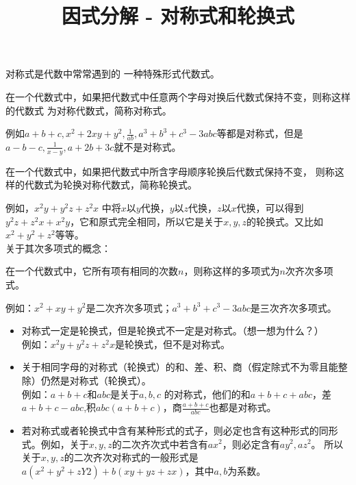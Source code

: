 \documentclass[windows,csize4]{BHCexam}
\title{因式分解 - 对称式和轮换式}
\begin{document}
\maketitle

\begin{groups}
    对称式是代数中常常遇到的 一种特殊形式代数式。\\ 
    \fbox
    {
        \parbox{\textwidth}
        {
            在一个代数式中，如果把代数式中任意两个字母对换后代数式保持不变，则称这样的代数式
            为对称代数式，简称对称式。
        }
    }
    例如$a+b+c,x^2+2xy+y^2,\frac{1}{ab},a^3+b^3+c^3-3abc$等都是对称式，但是
    $a-b-c,\frac{1}{x-y},a+2b+3c$就不是对称式。 \\ 

    \fbox
    {
        \parbox{\textwidth}
        {
            在一个代数式中，如果把代数式中所含字母顺序轮换后代数式保持不变，
            则称这样的代数式为轮换对称代数式，简称轮换式。
        }
    }
    例如，$x^2y+y^2z+z^2x$ 中将$x$以$y$代换，$y$以$z$代换，$z$以$x$代换，可以得到
    $y^2z+z^2x+x^2y$，它和原式完全相同，所以它是关于$x,y,z$的轮换式。又比如$x^2+y^2+z^2$等等。 \\ 

    关于其次多项式的概念： \\
    \fbox
    {
        \parbox{\textwidth}
        {
            在一个代数式中，它所有项有相同的次数$n$，则称这样的多项式为$n$次齐次多项式。
        }
    }
    例如：$x^2+xy+y^2$是二次齐次多项式；$a^3+b^3+c^3-3abc$是三次齐次多项式。


    \begin{itemize}
        \item 对称式一定是轮换式，但是轮换式不一定是对称式。（想一想为什么？）\\ 
        例如：$x^2y+y^2z+z^2x$是轮换式，但不是对称式。
        \item 关于相同字母的对称式（轮换式）的和、差、积、商（假定除式不为零且能整除）仍然是对称式（轮换式）。\\ 
        例如：$a+b+c$和$abc$是关于$a,b,c$ 的对称式，他们的和$a+b+c+abc$，差$a+b+c-abc$,积$abc(a+b+c)$，商$\frac{a+b+c}{abc}$也都是对称式。
        \item 若对称式或者轮换式中含有某种形式的式子，则必定也含有这种形式的同形式。例如，关于$x,y,z$的二次齐次式中若含有$ax^2$，则必定含有$ay^2,az^2$。
        所以关于$x,y,z$的二次齐次对称式的一般形式是$a(x^2+y^2+zY2)+b(xy+yz+zx)$，其中$a,b$为系数。
    \end{itemize}


\end{groups}
\end{document}
